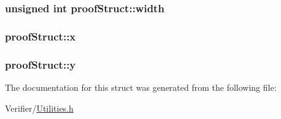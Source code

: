 \hypertarget{structproof_struct_a36aaf46a8b958a4eabc208bcab7ebe39}{
\subsubsection[{width}]{\setlength{\rightskip}{0pt plus 5cm}unsigned int proof\-Struct\-::width}}\label{structproof_struct_a36aaf46a8b958a4eabc208bcab7ebe39}
\hypertarget{structproof_struct_a6a2f1e91ede3cd60e65135b96873ba0b}{
\subsubsection[{x}]{ proof\-Struct\-::x}}\label{structproof_struct_a6a2f1e91ede3cd60e65135b96873ba0b}
\hypertarget{structproof_struct_a9244ef329dccb2486cf1e495a2ea750a}{
\subsubsection[{y}]{ proof\-Struct\-::y}}\label{structproof_struct_a9244ef329dccb2486cf1e495a2ea750a}


The documentation for this struct was generated from the following file\-:\begin{DoxyCompactItemize}
\item 
Verifier/\hyperlink{_utilities_8h}{Utilities.\-h}\end{DoxyCompactItemize}
